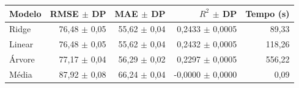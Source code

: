 \begin{tabularx}{\linewidth}{@{}Xrrrr@{}}\toprule Modelo & RMSE $\pm$ DP & MAE $\pm$ DP & $R^2$ $\pm$ DP & Tempo (s)\\\midrule
Ridge & 76,48 $\pm$ 0,05 & 55,62 $\pm$ 0,04 & 0,2433 $\pm$ 0,0005 & 89,33 \\
Linear & 76,48 $\pm$ 0,05 & 55,62 $\pm$ 0,04 & 0,2432 $\pm$ 0,0005 & 118,26 \\
Árvore & 77,17 $\pm$ 0,04 & 56,29 $\pm$ 0,02 & 0,2297 $\pm$ 0,0005 & 556,22 \\
Média & 87,92 $\pm$ 0,08 & 66,24 $\pm$ 0,04 & -0,0000 $\pm$ 0,0000 & 0,09 \\\bottomrule\end{tabularx}